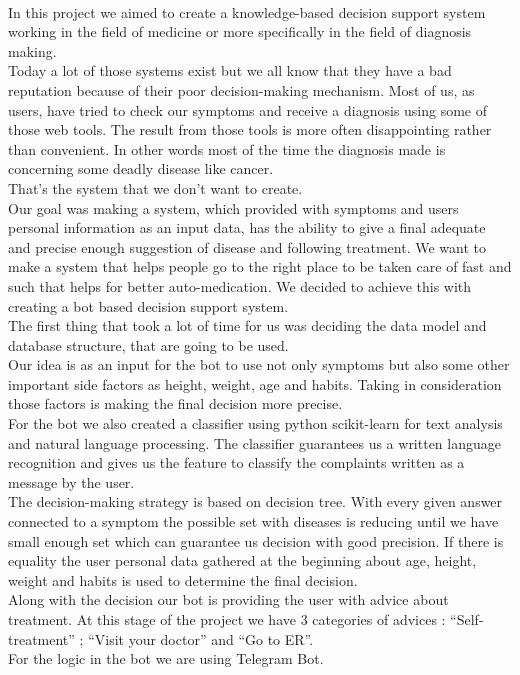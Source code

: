 	\paragraph{}
	In this project we aimed to create a knowledge-based decision support system working in the field of medicine or more specifically in the field of diagnosis making.\\
    Today a lot of those systems exist but we all know that they have a bad reputation because of their poor decision-making mechanism. Most of us, as users, have tried to check our symptoms and receive a diagnosis using some of those web tools. The result from those tools is more often disappointing rather than convenient. In other words most of the time the diagnosis made is concerning some deadly disease like cancer.\\
	That’s the system that we don’t want to create.\\ 
	Our goal was making a system, which provided with symptoms and users personal information as an input data, has the ability to give a final adequate and precise enough suggestion of disease and following treatment. We want to make a system that helps people go to the right place to be taken care of fast and such that helps for better auto-medication.
	We decided to achieve this with creating a bot based decision support system.\\  
	The first thing that took a lot of time for us was deciding the data model and database structure, that are going to be used.\\
	Our idea is as an input for the bot to use not only symptoms but also some other important side factors as height, weight, age and habits. Taking in consideration those factors is making the final decision more precise. \\
	For the bot we also created a classifier using python scikit-learn for text analysis and natural language processing. The classifier guarantees us a written language recognition and gives us the feature to classify the complaints written as a message by the user.\\ 
	The decision-making strategy is based on decision tree. With every given answer connected to a symptom the possible set with diseases is reducing until we have small enough set which can guarantee us decision with good precision. If there is equality the user personal data gathered at the beginning about age, height, weight and habits is used to determine the final decision. \\
	Along with the decision our bot is providing the user with advice about treatment. At this stage of the project we have 3 categories of advices :
	“Self-treatment” ; “Visit your doctor” and “Go to ER”. \\
	For the logic in the bot we are using Telegram Bot. 
	
